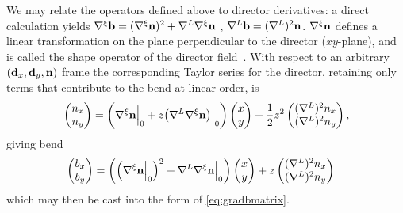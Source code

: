  We may relate the operators defined above to director derivatives: a direct calculation yields $\nabla^\xi \mathbf{b} = (\nabla^\xi{\bf n})^2+\nabla^L \nabla^\xi{\bf n}$ , $\nabla^L \mathbf{b} = (\nabla^L)^2 \mathbf{n}$. $\nabla^{\xi}{\bf n}$ defines a linear transformation on the plane perpendicular to the director ($xy$-plane), and is called the shape operator of the director field~\cite{MachonThesis,AlexanderBook}. With respect to an arbitrary $(\mathbf{d}_x,\mathbf{d}_y, \mathbf{n})$ frame the corresponding Taylor series for the director, retaining only terms that contribute to the bend at linear order, is
\begin{align}
\begin{pmatrix} n_x \\ n_y \end{pmatrix} & = \biggl( \Bigl. \nabla^\xi {\bf n} \Bigr\rvert_0 + z \Bigl. \bigl( \nabla^L\nabla^\xi {\bf n} \bigr) \Bigr\rvert_0 \biggr) \begin{pmatrix} x \\ y \end{pmatrix} + \frac{1}{2} z^2 \begin{pmatrix} (\nabla^L)^2 n_x \\ (\nabla^L)^2 n_y \end{pmatrix}, \\
\end{align}
giving bend
\begin{align}
\begin{pmatrix}b_x \\ b_y\end{pmatrix} & =
 \biggl( \Big( \Bigl. \nabla^\xi {\bf n} \Bigr\rvert_0 \Big)^2 + \Bigl. \nabla^L\nabla^\xi {\bf n} \Bigr\rvert_0 \biggr) \begin{pmatrix} x \\ y \end{pmatrix}
 + z \begin{pmatrix}(\nabla^L)^2 n_x \\ (\nabla^L)^2 n_y \end{pmatrix}
\label{eq:LocalBend}
\end{align}
which may then be cast into the form of \eqref{eq:gradbmatrix}.


